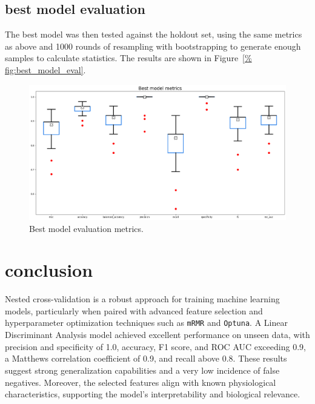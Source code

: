 \documentclass[12pt]{article}
\begin{document}
\subsection{best model evaluation}

The best model was then tested against the holdout set, using the same metrics
as above and 1000 rounds of resampling with bootstrapping to generate enough
samples to calculate statistics. The results are shown in Figure~\ref{%
fig:best_model_eval}.

\begin{figure}[H]
    \centering
    \includegraphics[width=\textwidth]{ims/best.png}
    \caption{Best model evaluation metrics.}
    \label{fig:best_model_eval}
\end{figure}


\section{conclusion}

Nested cross-validation is a robust approach for training machine learning
models, particularly when paired with advanced feature selection and
hyperparameter optimization techniques such as \texttt{mRMR} and
\texttt{Optuna}. A Linear Discriminant Analysis model achieved excellent
performance on unseen data, with precision and specificity of 1.0, accuracy, F1
score, and ROC AUC exceeding 0.9, a Matthews correlation coefficient of 0.9, and
recall above 0.8. These results suggest strong generalization capabilities and a
very low incidence of false negatives. Moreover, the selected features align
with known physiological characteristics, supporting the model's
interpretability and biological relevance.

\clearpage
{}


\end{document}
